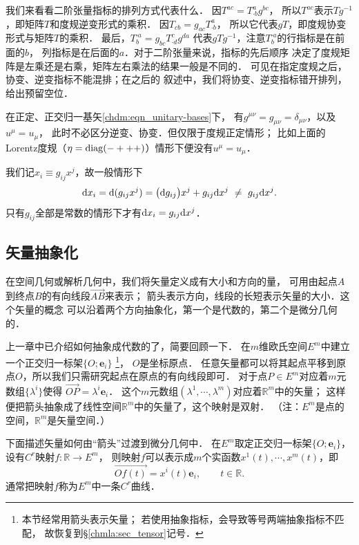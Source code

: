 我们来看看二阶张量指标的排列方式代表什么．
因$T^{ac}=T^{a}_{\cdot b}g^{bc}$，
所以$T^{ac}$表示$Tg^{-1}$，即矩阵$T$和度规逆变形式的乘积．
因$T_{cb}=g_{ac}T^{a}_{\cdot b}$，
所以它代表$g T$，即度规协变形式与矩阵$T$的乘积．
最后，$T^{\cdot a}_{b}=g_{bc}T^{c}_{\cdot d}g^{da}$
代表$g T g^{-1}$，注意$T^{\cdot a}_{b}$的行指标是在前面的$b$，
列指标是在后面的$a$．对于二阶张量来说，指标的先后顺序
决定了度规矩阵是左乘还是右乘，矩阵左右乘法的结果一般是不同的．
可见在指定度规之后，协变、逆变指标不能混排；在之后的
叙述中，我们将协变、逆变指标错开排列，给出预留空位．

在{\kaishu 正定、正交归一}基矢\eqref{chdm:eqn_unitary-bases}下，
有$g^{\mu\nu}=g_{\mu\nu}=\delta_{\mu\nu}$，以及$u^\mu = u_\mu$，
此时不必区分逆变、协变．但仅限于度规正定情形；
比如上面的Lorentz度规（$\eta={\rm diag}(-+++)$）情形下便没有$u^\mu = u_\mu$．

我们记$x_i \equiv g_{ij}x^j$，故一般情形下
\begin{align}
	{\rm d}x_i = {\rm d}(g_{ij}x^j) = \bigl({\rm d}g_{ij}\bigr)x^j+ g_{ij}{\rm d}x^j
	\  \neq \ g_{ij}{\rm d}x^j.
\end{align}
只有$g_{ij}$全部是常数的情形下才有${\rm d}x_i =g_{ij}{\rm d}x^j$．



\subsection{矢量抽象化}\label{chdm:sec_vector-abstract2geo}
在空间几何或解析几何中，我们将矢量定义成有大小和方向的量，
可用由起点$A$到终点$B$的有向线段$\overrightarrow{AB}$来表示；
箭头表示方向，线段的长短表示矢量的大小．这个矢量的概念
可以沿着两个方向{\kaishu 抽象化}，第一个是代数的，第二个是微分几何的．

上一章中已介绍如何抽象成代数的了，简要回顾一下．
在$m$维欧氏空间$E^m$中建立一个正交归一标架$\{O;\boldsymbol{e}_i\}$
{\footnote{本节经常用箭头表示矢量；
        若使用抽象指标，会导致等号两端抽象指标不匹配，
    故恢复到\S\ref{chmla:sec_tensor}记号．}}，
$O$是坐标原点．
任意矢量都可以将其起点平移到原点$O$，所以我们只需研究起点在原点的有向线段即可．
对于点$P \in E^m$对应着$m$元数组$\{\lambda^i\}$使得
$    \overrightarrow{OP} = \lambda^i \boldsymbol{e}_i $．
这个$m$元数组$(\lambda^1,\cdots,\lambda^m)$对应着$\mathbb{R}^m$中的矢量；
这样便把箭头抽象成了线性空间$\mathbb{R}^m$中的矢量了，这个映射是双射．
（注：$E^m$是{\kaishu 点}的空间，$\mathbb{R}^m$是{\kaishu 矢量}空间．）

下面描述矢量如何由“箭头”过渡到微分几何中．
在$E^m$取定正交归一标架$\{O;\boldsymbol{e}_i\}$，设有$C^r$映射$f:\mathbb{R} \to E^m$，
则映射$f$可以表示成$m$个实函数$x^1(t),\cdots, x^m(t)$，即
\begin{equation}
    \overrightarrow{Of(t)} = x^i(t) \boldsymbol{e}_i , \qquad t\in \mathbb{R} .
\end{equation}
通常把映射$f$称为$E^m$中一条$C^r${\kaishu 曲线}．

